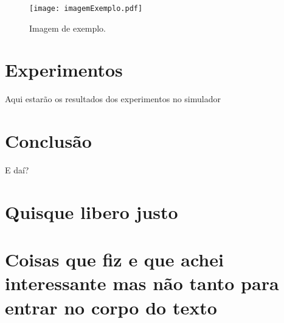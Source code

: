 \documentclass[12pt, %
openright, 
oneside, %
a4paper,    %
brazil]{facom-ufu-abntex2}
\begin{document}
\begin{figure}[!ht]
    \centering
	\texttt{[image: imagemExemplo.pdf]}
	\caption[Isso é o que aparece no sumário]{Imagem de exemplo.}
	\label{fig:graficosVariandoTamanhoRede}
\end{figure}

\chapter{Experimentos}
Aqui estarão os resultados dos experimentos no simulador


\chapter[Conclusão]{Conclusão}
E daí?





\postextual






\begin{apendicesenv}

\partapendices

\chapter{Quisque libero justo}

\lipsum[50]

\chapter{Coisas que fiz e que achei interessante mas não tanto para entrar no corpo do texto}
\lipsum[55-57]

\end{apendicesenv}
\end{document}
